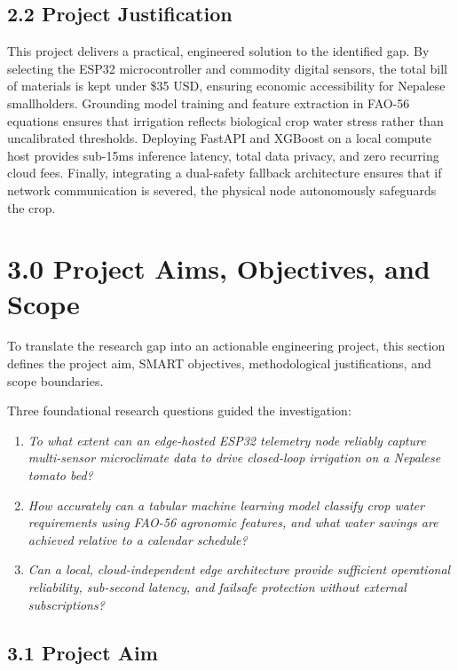 \documentclass[12pt, a4paper]{article}
\begin{document}
\subsection{2.2 Project Justification}
\label{sec:justification}

This project delivers a practical, engineered solution to the identified gap. By selecting the ESP32 microcontroller and commodity digital sensors, the total bill of materials is kept under \$35 USD, ensuring economic accessibility for Nepalese smallholders. Grounding model training and feature extraction in FAO-56 equations ensures that irrigation reflects biological crop water stress rather than uncalibrated thresholds. Deploying FastAPI and XGBoost on a local compute host provides sub-15ms inference latency, total data privacy, and zero recurring cloud fees. Finally, integrating a dual-safety fallback architecture ensures that if network communication is severed, the physical node autonomously safeguards the crop.

\section{3.0 Project Aims, Objectives, and Scope}
\label{sec:aims}

To translate the research gap into an actionable engineering project, this section defines the project aim, SMART objectives, methodological justifications, and scope boundaries.

Three foundational research questions guided the investigation:
\begin{enumerate}[leftmargin=1.4cm, itemsep=2pt]
  \item \emph{To what extent can an edge-hosted ESP32 telemetry node reliably capture multi-sensor microclimate data to drive closed-loop irrigation on a Nepalese tomato bed?}
  \item \emph{How accurately can a tabular machine learning model classify crop water requirements using FAO-56 agronomic features, and what water savings are achieved relative to a calendar schedule?}
  \item \emph{Can a local, cloud-independent edge architecture provide sufficient operational reliability, sub-second latency, and failsafe protection without external subscriptions?}
\end{enumerate}

\subsection{3.1 Project Aim}
\label{sec:aim}
\end{document}
